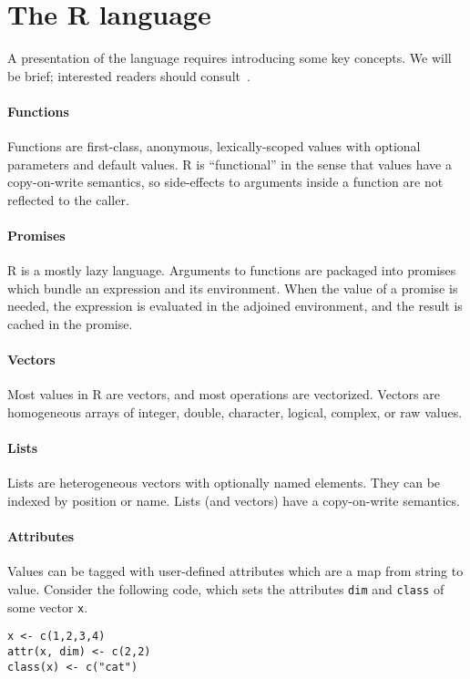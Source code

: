 \documentclass[10pt,sigplan,authorversion=true]{acmart}
\renewcommand{\c}[1]{\lstinline |#1|\xspace}
\begin{document}
\section{The R language}

A presentation of the language requires introducing some key concepts. We will
be brief; interested readers should consult~\cite{AdvancedR}.

\paragraph{Functions} Functions are first-class, anonymous, lexically-scoped values
with optional parameters and default values. R is ``functional'' in the sense
that values have a copy-on-write semantics, so side-effects to arguments inside
a function are not reflected to the caller.

\paragraph{Promises} R is a mostly lazy language. Arguments to functions are
packaged into promises which bundle an expression and its environment. When the
value of a promise is needed, the expression is evaluated in the adjoined
environment, and the result is cached in the promise.

\paragraph{Vectors}  Most values in R are vectors, and most operations are
vectorized. Vectors are homogeneous arrays of integer, double, character,
logical, complex, or raw values.

\paragraph{Lists} Lists are heterogeneous vectors with optionally named elements.
They can be indexed by position or name. Lists (and vectors) have a
copy-on-write semantics.

\paragraph{Attributes}
Values can be tagged with user-defined attributes which are a map from string to
value. Consider the following code, which sets the attributes \c{dim} and
\c{class} of some vector \c{x}.

\begin{lstlisting}
x <- c(1,2,3,4)
attr(x, dim) <- c(2,2)
class(x) <- c("cat")
\end{lstlisting}
\end{document}
